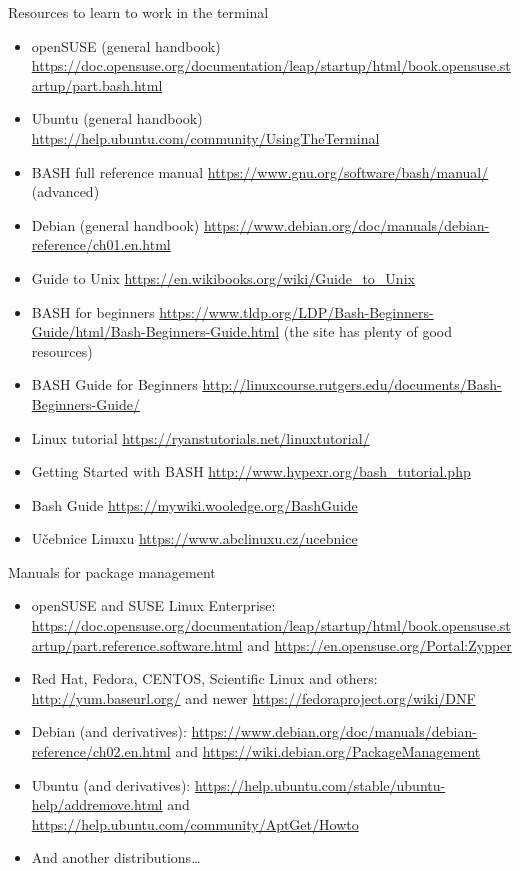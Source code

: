 \documentclass[compress, ucs, xelatex, 11pt, xcolor=svgnames,
  hyperref={
    bookmarks=true,
    unicode=true,
    colorlinks=true,
    pdftitle={Linux, command line and MetaCentrum},
    plainpages=false,
    pdfauthor={Vojtech Zeisek},
    pdfsubject={Course about use of Linux command line, writing shell scripts and using MetaCentrum of CESNET},
    pdfcreator={XeLaTeX},
    pdfkeywords={Linux, GNU, BASH, shell, command line, MetaCentrum},
    linkcolor=DarkRed,
    anchorcolor=DarkBlue,
    citecolor=Indigo,
    filecolor=NavyBlue,
    menucolor=DarkMagenta,
    urlcolor=DarkBlue,
    pdftex},
  url={hyphens, lowtilde} %
  ]{beamer}
\begin{document}
\begin{frame}[allowframebreaks]{Resources to learn to work in the terminal}
  \begin{itemize}
    \item openSUSE (general handbook) \url{https://doc.opensuse.org/documentation/leap/startup/html/book.opensuse.startup/part.bash.html}
    \item Ubuntu (general handbook) \url{https://help.ubuntu.com/community/UsingTheTerminal}
    \item BASH full reference manual \url{https://www.gnu.org/software/bash/manual/} (advanced)
    \item Debian (general handbook) \url{https://www.debian.org/doc/manuals/debian-reference/ch01.en.html}
    \item Guide to Unix \url{https://en.wikibooks.org/wiki/Guide_to_Unix}
    \item BASH for beginners \url{https://www.tldp.org/LDP/Bash-Beginners-Guide/html/Bash-Beginners-Guide.html} (the site has plenty of good resources)
    \item BASH Guide for Beginners \url{http://linuxcourse.rutgers.edu/documents/Bash-Beginners-Guide/}
    \item Linux tutorial \url{https://ryanstutorials.net/linuxtutorial/}
    \item Getting Started with BASH \url{http://www.hypexr.org/bash_tutorial.php}
    \item Bash Guide \url{https://mywiki.wooledge.org/BashGuide}
    \item Učebnice Linuxu \url{https://www.abclinuxu.cz/ucebnice}
  \end{itemize}
\end{frame}

\begin{frame}{Manuals for package management}
  \begin{itemize}
    \item openSUSE and SUSE Linux Enterprise: \url{https://doc.opensuse.org/documentation/leap/startup/html/book.opensuse.startup/part.reference.software.html} and \url{https://en.opensuse.org/Portal:Zypper}
    \item Red Hat, Fedora, CENTOS, Scientific Linux and others: \url{http://yum.baseurl.org/} and newer \url{https://fedoraproject.org/wiki/DNF}
    \item Debian (and derivatives): \url{https://www.debian.org/doc/manuals/debian-reference/ch02.en.html} and \url{https://wiki.debian.org/PackageManagement}
    \item Ubuntu (and derivatives): \url{https://help.ubuntu.com/stable/ubuntu-help/addremove.html} and \url{https://help.ubuntu.com/community/AptGet/Howto}
    \item And another distributions\ldots
  \end{itemize}
\end{frame}
\end{document}
